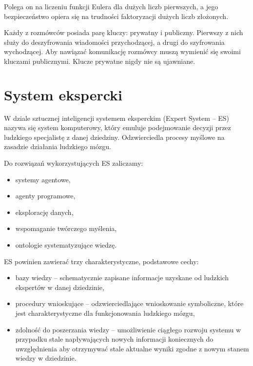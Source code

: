 \documentclass[12pt,a4paper]{article}
\begin{document}
	\smallskip
	Polega on na liczeniu funkcji Eulera dla dużych liczb pierwszych, a jego bezpieczeństwo opiera się na trudności faktoryzacji dużych liczb złożonych.
	
	\smallskip
	Każdy z rozmówców posiada parę kluczy: prywatny i publiczny. Pierwszy z nich służy do deszyfrowania wiadomości przychodzącej, a drugi do szyfrowania wychodzącej. Aby nawiązać komunikację rozmówcy muszą wymienić się swoimi kluczami publicznymi. Klucze prywatne nigdy nie są ujawniane.
	
	
\section*{System ekspercki}

	W dziale sztucznej inteligencji systemem eksperckim (Expert System -- ES) nazywa się system komputerowy, który emuluje podejmowanie decyzji przez ludzkiego specjalistę z danej dziedziny. Odzwierciedla procesy myślowe na zasadzie działania ludzkiego mózgu.
	
	Do rozwiązań wykorzystujących ES zaliczamy:
	\begin{itemize}
		\item systemy agentowe,
		\item agenty programowe,
		\item eksplorację danych,
		\item wspomaganie twórczego myślenia,
		\item ontologie systematyzujące wiedzę.
	\end{itemize}
	\bigskip
	
	ES powinien zawierać trzy charakterystyczne, podstawowe cechy:
	\begin{itemize}
		\item bazy wiedzy -- schematycznie zapisane informacje uzyskane od ludzkich ekspertów w danej dziedzinie,
		\item procedury wnioskujące -- odzwierciedlające wnioskowanie symboliczne, które jest charakterystyczne dla funkcjonowania ludzkiego mózgu,
		\item zdolność do poszerzania wiedzy -- umożliwienie ciągłego rozwoju systemu w przypadku stale napływających nowych informacji koniecznych do uwzględnienia aby otrzymywać stale aktualne wyniki zgodne z nowym stanem wiedzy w dziedzinie.
	\end{itemize}
	\bigskip
	
\end{document}
